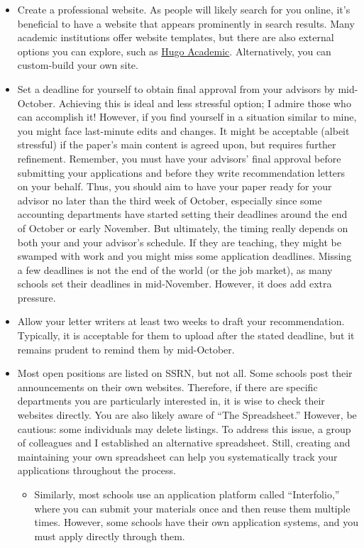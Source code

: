 \documentclass[12pt]{article}
\begin{document}
\begin{itemize}
\item Create a professional website. As people will likely search for you online, it's beneficial to have a website that appears prominently in search results. Many academic institutions offer website templates, but there are also external options you can explore, such as \href{https://github.com/wowchemy/starter-hugo-academic}{Hugo Academic}. Alternatively, you can custom-build your own site.
\item Set a deadline for yourself to obtain final approval from your advisors by mid-October. Achieving this is ideal and less stressful option; I admire those who can accomplish it! However, if you find yourself in a situation similar to mine, you might face last-minute edits and changes. It might be acceptable (albeit stressful) if the paper's main content is agreed upon, but requires further refinement. Remember, you must have your advisors' final approval before submitting your applications and before they write recommendation letters on your behalf. Thus, you should aim to have your paper ready for your advisor no later than the third week of October, especially since some accounting departments have started setting their deadlines around the end of October or early November. But ultimately, the timing really depends on both your and your advisor's schedule. If they are teaching, they might be swamped with work and you might miss some application deadlines. Missing a few deadlines is not the end of the world (or the job market), as many schools set their deadlines in mid-November. However, it does add extra pressure.
\item Allow your letter writers at least two weeks to draft your recommendation. Typically, it is acceptable for them to upload after the stated deadline, but it remains prudent to remind them by mid-October.
\item Most open positions are listed on SSRN, but not all. Some schools post their announcements on their own websites. Therefore, if there are specific departments you are particularly interested in, it is wise to check their websites directly. You are also likely aware of ``The Spreadsheet.'' However, be cautious: some individuals may delete listings. To address this issue, a group of colleagues and I established an alternative spreadsheet. Still, creating and maintaining your own spreadsheet can help you systematically track your applications throughout the process.
\begin{itemize}
\item Similarly, most schools use an application platform called ``Interfolio,'' where you can submit your materials once and then reuse them multiple times. However, some schools have their own application systems, and you must apply directly through them.

\end{itemize}
\end{itemize}
\end{document}

